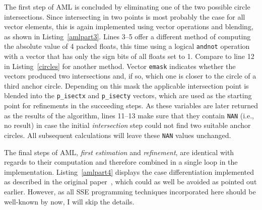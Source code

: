 
The first step of AML is concluded by eliminating one of the two possible circle intersections. Since intersecting in two points is most probably the case for all vector elements, this is again implemented using vector operations and blending, as shown in Listing~\ref{amlpart3}. Lines 3--5 offer a different method of computing the absolute value of 4 packed floats, this time using a logical \texttt{andnot} operation with a vector that has only the sign bits of all floats set to 1. Compare to line 12 in Listing~\ref{circles} for another method. Vector \texttt{emask} indicates whether the vectors produced two intersections and, if so, which one is closer to the circle of a third anchor circle. Depending on this mask the applicable intersection point is blended into the \texttt{p\_isectx} and \texttt{p\_isecty} vectors, which are used as the starting point for refinements in the succeeding steps. As these variables are later returned as the results of the algorithm, lines 11--13 make sure that they contain \texttt{NAN} (i.e., no result) in case the initial \emph{intersection} step could not find two suitable anchor circles. All subsequent calculations will leave these \texttt{NAN} values unchanged.


The final steps of AML, \emph{first estimation} and \emph{refinement}, are identical with regards to their computation and therefore combined in a single loop in the implementation. Listing~\ref{amlpart4} displays the case differentiation implemented as described in the original paper~\cite[p. 264]{kuruoglu2009aml}, which could as well be avoided as pointed out earlier. However, as all SSE programming techniques incorporated here should be well-known by now, I will skip the details.


